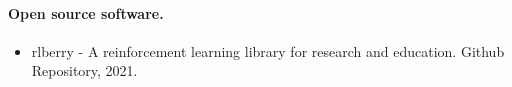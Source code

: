 \paragraph{Open source software.}

\begin{itemize}[label=]
    \item rlberry - A reinforcement learning library for research and education. Github Repository, 2021.~\citep{rlberry2021}
\end{itemize}









% 
% 
